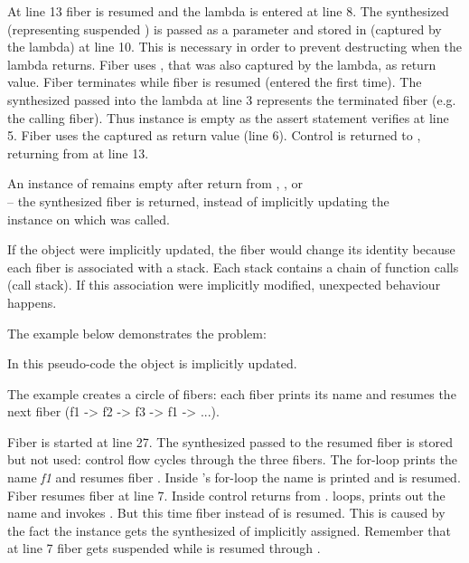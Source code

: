 At line 13 fiber  is resumed and the lambda is entered at line 8. The
synthesized \fiber\xspace {} (representing suspended \main) is passed as a
parameter  and stored in  (captured by the lambda) at line 10.
This is necessary in order to prevent destructing  when the lambda
returns. Fiber  uses , that was also captured by the lambda, as
return value. Fiber  terminates while fiber  is resumed (entered
the first time). The synthesized \fiber\xspace {} passed into the lambda at line 3
represents the terminated fiber  (e.g. the calling fiber). Thus instance
 is empty as the assert statement verifies at line 5. Fiber  uses
the captured \fiber\xspace {} as return value (line 6). Control is returned to
\main, returning from  at line 13.


\label{fiberreturn}
An instance of \fiber remains empty after return from \resume, \resumewith,
\xtresume or\\
\xtresumewith -- the synthesized fiber is returned, instead of
implicitly updating the\\\fiber instance on which \resume was called.

If the \fiber object were implicitly updated, the fiber would 
change its identity because each fiber is associated with a stack. Each stack
contains a chain of function calls (call stack). If this association were
implicitly modified, unexpected behaviour happens.

The example below demonstrates the problem:

In this pseudo-code the \fiber object is implicitly updated.

The example creates a circle of fibers: each fiber prints its name and resumes
the next fiber (f1 -> f2 -> f3 -> f1 -> ...).

Fiber  is started at line 27. The synthesized \fiber\xspace {} passed 
to the resumed fiber is stored but not used: control flow cycles through the three
fibers.
The for-loop prints the name \emph{f1} and resumes fiber . Inside 
's for-loop the name is printed and  is resumed. Fiber 
resumes fiber  at line 7. Inside  control returns from
.  loops, prints out the name and invokes . But
this time fiber  instead of  is resumed. This is caused by the
fact the instance  gets the synthesized \fiber of  implicitly
assigned. Remember that at line 7 fiber  gets suspended while 
is resumed through .

